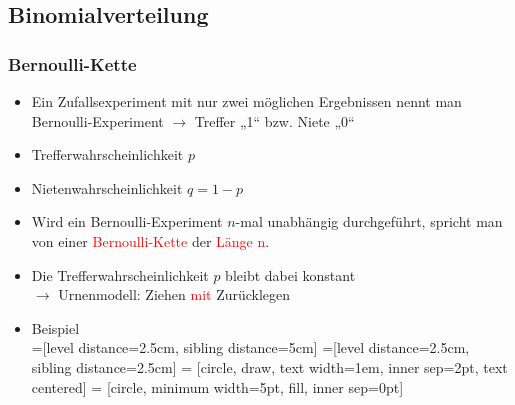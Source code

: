 \subsection{Binomialverteilung}
\subsubsection{Bernoulli-Kette}
\begin{itemize}
    \item Ein Zufallsexperiment mit nur zwei möglichen Ergebnissen nennt man Bernoulli-Experiment $ \longrightarrow$ Treffer „1“ bzw. Niete „0“
    \item Trefferwahrscheinlichkeit $p$
    \item Nietenwahrscheinlichkeit $q = 1-p$
    \item Wird ein Bernoulli-Experiment $n$-mal unabhängig durchgeführt, spricht man von einer \textcolor{red}{Bernoulli-Kette} der \textcolor{red}{Länge n}. 
    \item Die Trefferwahrscheinlichkeit $p$ bleibt dabei konstant \\$\longrightarrow$ Urnenmodell: Ziehen \textcolor{red}{mit} Zurücklegen
    \item Beispiel\\
=[level distance=2.5cm, sibling distance=5cm]
=[level distance=2.5cm, sibling distance=2.5cm]
 = [circle, draw, text width=1em, inner sep=2pt, text centered]
 = [circle, minimum width=5pt, fill, inner sep=0pt]
\end{itemize}

